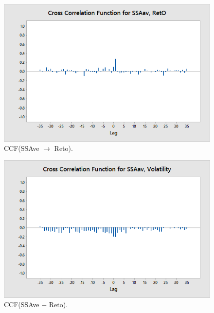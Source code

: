 	\begin{figure}[!ht]
	\centering
	\includegraphics[width=\textwidth]{chapters/chapter_news_an/figures/ch4sec4crossfssaavreto} 
	\caption{CCF(SSAve $\rightarrow$ Reto). \label{fig:ccfssavreto}}
	\end{figure}

	\begin{figure}[!ht]
	\centering
	\includegraphics[width=\textwidth]{chapters/chapter_news_an/figures/ch4sec4ssaavvola} 
	\caption{CCF(SSAve $-$ Reto). \label{fig:ccfssavvol}}
	\end{figure}

